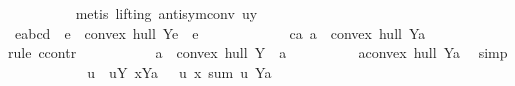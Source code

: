 \begin{isabellebody}
\ \ \ \ \ \ \ \ \isamarkupfalse%
\ {\isacharparenleft}{\kern0pt}metis\ {\isacharparenleft}{\kern0pt}lifting{\isacharparenright}{\kern0pt}\ antisym{\isacharunderscore}{\kern0pt}conv{}\ uy{\isacharparenleft}{\kern0pt}{}{\isacharcomma}{\kern0pt}{}{\isacharcomma}{\kern0pt}{}{\isacharparenright}{\kern0pt}{\isacharparenright}{\kern0pt}\isanewline
\ \ \ \ \isamarkupfalse%
\isanewline
\isanewline
\ \ \ \ \isamarkupfalse%
\ {\isachardoublequoteopen}e{\isasymin}{\isacharbraceleft}{\kern0pt}a{\isacharcomma}{\kern0pt}b{\isacharcomma}{\kern0pt}c{\isacharcomma}{\kern0pt}d{\isacharbraceright}{\kern0pt}\ {\isasymLongrightarrow}\ e\ {\isasymnotin}\ convex\ hull\ {\isacharparenleft}{\kern0pt}Y{\isacharminus}{\kern0pt}{\isacharbraceleft}{\kern0pt}e{\isacharbraceright}{\kern0pt}{\isacharparenright}{\kern0pt}{\isachardoublequoteclose}\ \ e\isanewline
\ \ \ \ \isamarkupfalse%
{\isacharminus}{\kern0pt}\isanewline
\ \ \ \ \ \ \isamarkupfalse%
\ ca{\isacharcolon}{\kern0pt}{\isachardoublequoteopen}{\isasymnot}\ a\ {\isasymin}\ convex\ hull\ {\isacharparenleft}{\kern0pt}Y{\isacharminus}{\kern0pt}{\isacharbraceleft}{\kern0pt}a{\isacharbraceright}{\kern0pt}{\isacharparenright}{\kern0pt}{\isachardoublequoteclose}\isanewline
\ \ \ \ \ \ \isamarkupfalse%
{\isacharparenleft}{\kern0pt}rule\ ccontr{\isacharparenright}{\kern0pt}\isanewline
\ \ \ \ \ \ \ \ \isamarkupfalse%
\ {\isachardoublequoteopen}{\isasymnot}\ a\ {\isasymnotin}\ convex\ hull\ {\isacharparenleft}{\kern0pt}Y\ {\isacharminus}{\kern0pt}\ {\isacharbraceleft}{\kern0pt}a{\isacharbraceright}{\kern0pt}{\isacharparenright}{\kern0pt}{\isachardoublequoteclose}\isanewline
\ \ \ \ \ \ \ \ \isamarkupfalse%
\ {\isachardoublequoteopen}a{\isasymin}convex\ hull\ {\isacharparenleft}{\kern0pt}Y{\isacharminus}{\kern0pt}{\isacharbraceleft}{\kern0pt}a{\isacharbraceright}{\kern0pt}{\isacharparenright}{\kern0pt}{\isachardoublequoteclose}\ \isamarkupfalse%
\ simp\isanewline
\ \ \ \ \ \ \ \ \isamarkupfalse%
\ \isamarkupfalse%
\ u\ \ uY{\isacharcolon}{\kern0pt}\ {\isachardoublequoteopen}{\isacharparenleft}{\kern0pt}{\isasymforall}x{\isasymin}{\isacharparenleft}{\kern0pt}Y{\isacharminus}{\kern0pt}{\isacharbraceleft}{\kern0pt}a{\isacharbraceright}{\kern0pt}{\isacharparenright}{\kern0pt}{\isachardot}{\kern0pt}\ {}\ {\isacharless}{\kern0pt}\ u\ x{\isacharparenright}{\kern0pt}{\isachardoublequoteclose}\ {\isachardoublequoteopen}sum\ u\ {\isacharparenleft}{\kern0pt}Y{\isacharminus}{\kern0pt}{\isacharbraceleft}{\kern0pt}a{\isacharbraceright}{\kern0pt}{\isacharparenright}{\kern0pt}\ {\isacharequal}{\kern0pt}\ {}{\isachardoublequoteclose}\isanewline

\end{isabellebody}
